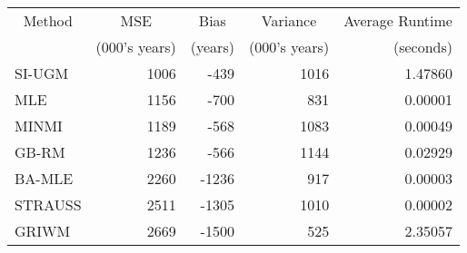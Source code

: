 
\begin{tabular}{lrrrr}
\toprule
\multicolumn{1}{c}{Method} & \multicolumn{1}{c}{MSE} & \multicolumn{1}{c}{Bias} & \multicolumn{1}{c}{Variance} & \multicolumn{1}{c}{Average Runtime} \\
\cmidrule(l{3pt}r{3pt}){1-1} \cmidrule(l{3pt}r{3pt}){2-2} \cmidrule(l{3pt}r{3pt}){3-3} \cmidrule(l{3pt}r{3pt}){4-4} \cmidrule(l{3pt}r{3pt}){5-5}
 & (000's years) & (years) & (000's years) & (seconds)\\
\midrule
SI-UGM & 1006 & -439 & 1016 & 1.47860\\
MLE & 1156 & -700 & 831 & 0.00001\\
MINMI & 1189 & -568 & 1083 & 0.00049\\
GB-RM & 1236 & -566 & 1144 & 0.02929\\
BA-MLE & 2260 & -1236 & 917 & 0.00003\\
\addlinespace
STRAUSS & 2511 & -1305 & 1010 & 0.00002\\
GRIWM & 2669 & -1500 & 525 & 2.35057\\
\bottomrule
\end{tabular}
